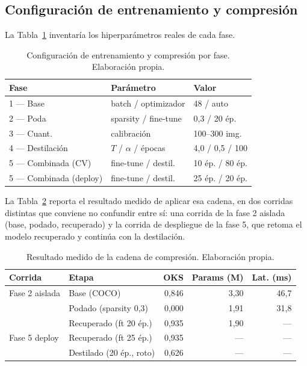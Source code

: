 \documentclass[10pt,a4paper,twocolumn]{article}
\begin{document}
\subsection{Configuración de entrenamiento y compresión}
La Tabla~\ref{tab:config} inventaría los hiperparámetros reales de cada fase.

\begin{table}[t]
\caption{Configuración de entrenamiento y compresión por fase. Elaboración propia.}
\label{tab:config}
\centering
\fontsize{9}{11}\selectfont
\setlength{\tabcolsep}{4pt}
\begin{tabular}{@{}p{2.0cm}p{2.6cm}p{1.6cm}@{}}
\toprule
\textbf{Fase} & \textbf{Parámetro} & \textbf{Valor} \\
\midrule
1 — Base & batch / optimizador & 48 / auto \\
2 — Poda & sparsity / fine-tune & 0,3 / 20 ép. \\
3 — Cuant. & calibración & 100--300 img. \\
4 — Destilación & $T$ / $\alpha$ / épocas & 4,0 / 0,5 / 100 \\
5 — Combinada (CV) & fine-tune / destil. & 10 ép. / 80 ép. \\
5 — Combinada (deploy) & fine-tune / destil. & 25 ép. / 20 ép. \\
\bottomrule
\end{tabular}
\end{table}

La Tabla~\ref{tab:cadena} reporta el resultado medido de aplicar esa cadena,
en dos corridas distintas que conviene no confundir entre sí: una corrida de
la fase 2 aislada (base, podado, recuperado) y la corrida de despliegue de la
fase 5, que retoma el modelo recuperado y continúa con la destilación.

\begin{table}[t]
\caption{Resultado medido de la cadena de compresión. Elaboración propia.}
\label{tab:cadena}
\centering
\fontsize{9}{11}\selectfont
\setlength{\tabcolsep}{3.5pt}
\begin{tabular}{@{}p{1.5cm}p{2.0cm}rrr@{}}
\toprule
\textbf{Corrida} & \textbf{Etapa} & \textbf{OKS} & \textbf{Params (M)} & \textbf{Lat. (ms)} \\
\midrule
Fase 2 aislada & Base (COCO) & 0,846 & 3,30 & 46,7 \\
 & Podado (sparsity 0,3) & 0,000 & 1,91 & 31,8 \\
 & Recuperado (ft 20 ép.) & 0,935 & 1,90 & --- \\
\addlinespace
Fase 5 deploy & Recuperado (ft 25 ép.) & 0,935 & --- & --- \\
 & Destilado (20 ép., roto) & 0,626 & --- & --- \\
\bottomrule
\end{tabular}
\end{table}
\end{document}

